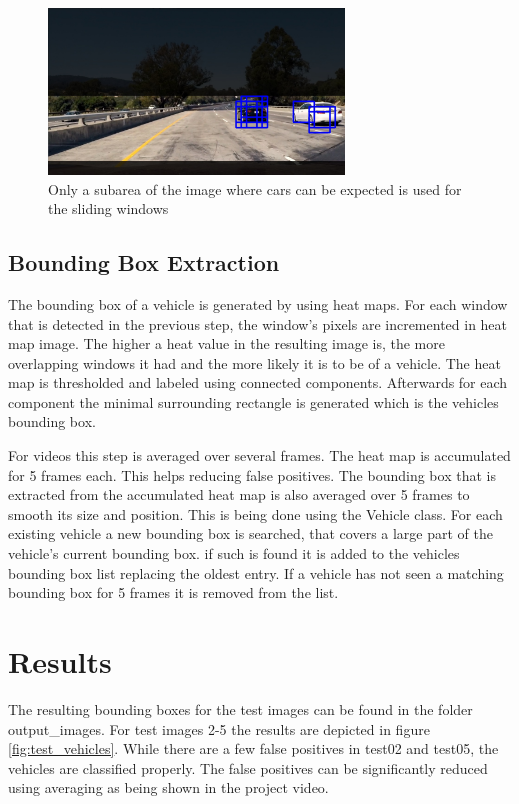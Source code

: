 \documentclass[a4paper, 11pt, DIV=14]{scrartcl}
\begin{document}
\begin{figure}[h]
    \centering
    \includegraphics[width=0.7\textwidth]{output_images/test1_range.jpg}
        \caption{Only a subarea of the image where cars can be expected is used for the sliding windows}
    \label{fig:y_area}
\end{figure}

\subsection{Bounding Box Extraction} 
The bounding box of a vehicle is generated by using heat maps. For each window that is detected in the previous step, the window's pixels are incremented in heat map image. The higher a heat value in the resulting image is, the more overlapping windows it had and the more likely it is to be of a vehicle. The heat map is thresholded and labeled using connected components. Afterwards for each component the minimal surrounding rectangle is generated which is the vehicles bounding box.

For videos this step is averaged over several frames. The heat map is accumulated for 5 frames each. This helps reducing false positives. The bounding box that is extracted from the accumulated heat map is also averaged over 5 frames to smooth its size and position. This is being done using the Vehicle class. For each existing vehicle a new bounding box is searched, that covers a large part of the vehicle's current bounding box. if such is found it is added to the vehicles bounding box list replacing the oldest entry. If a vehicle has not seen a matching bounding box for 5 frames it is removed from the list.

\section{Results}
The resulting bounding boxes for the test images can be found in the folder output\_images. For test images 2-5 the results are depicted in figure \ref{fig:test_vehicles}. While there are a few false positives in test02 and test05, the vehicles are classified properly. The false positives can be significantly reduced using averaging as being shown in the project video.
\end{document}
